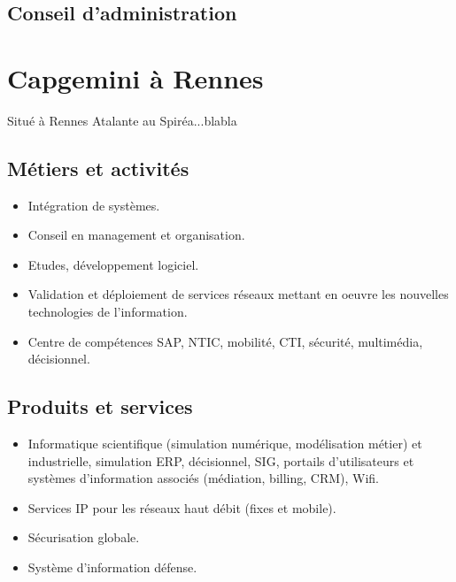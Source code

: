 \subsection{Conseil d'administration}

\section{Capgemini à Rennes}
Situé à Rennes Atalante au Spiréa...blabla
\subsection{Métiers et activités}
\begin{itemize}
\item Intégration de systèmes.
\item Conseil en management et organisation.
\item Etudes, développement logiciel.
\item Validation et déploiement de services réseaux mettant en oeuvre les nouvelles technologies de l'information.
\item Centre de compétences SAP, NTIC, mobilité, CTI, sécurité, multimédia, décisionnel.
\end{itemize}
\subsection{Produits et services}
\begin{itemize}
\item Informatique scientifique (simulation numérique, modélisation métier) et industrielle, simulation ERP, décisionnel, SIG, portails d'utilisateurs et systèmes d'information associés (médiation, billing, CRM), Wifi.
\item Services IP pour les réseaux haut débit (fixes et mobile).
\item Sécurisation globale.
\item Système d'information défense.
\end{itemize}
